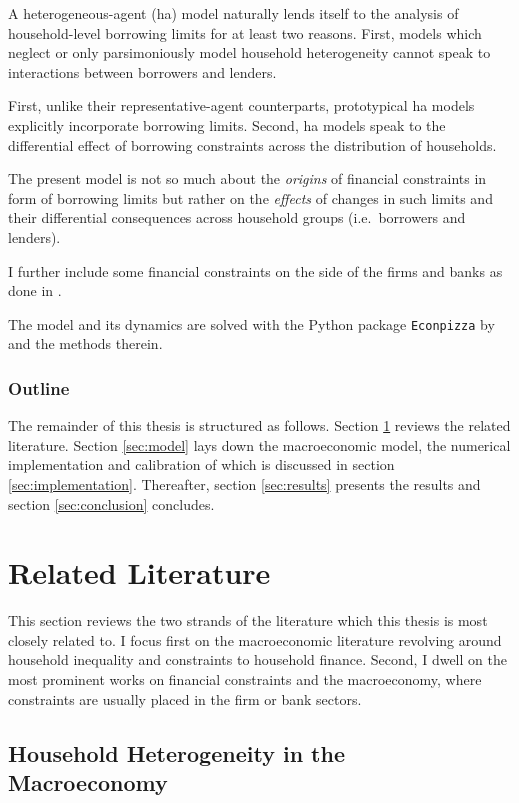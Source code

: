 \documentclass[12pt]{article}
\numberwithin{equation}{section} %
\begin{document}
A heterogeneous-agent (\Gls{ha}) model naturally lends itself to the analysis of household-level borrowing limits for at least two reasons. First, models which neglect or only parsimoniously model household heterogeneity cannot speak to interactions between borrowers and lenders.

First, unlike their representative-agent counterparts, prototypical \Gls{ha} models explicitly incorporate borrowing limits. Second, \Gls{ha} models speak to the differential effect of borrowing constraints across the distribution of households.

The present model is not so much about the \textit{origins} of financial constraints in form of borrowing limits but rather on the \textit{effects} of changes in such limits and their differential consequences across household groups (i.e.~borrowers and lenders).

I further include some financial constraints on the side of the firms and banks as done in \textcite{zoch2022}.

The model and its dynamics are solved with the Python package \texttt{Econpizza} by \textcite{boehl2023econpizza} and the methods therein.

\subsubsection*{Outline}
\label{sec:outline}
The remainder of this thesis is structured as follows. Section \ref{sec:literature} reviews the related literature. Section \ref{sec:model} lays down the macroeconomic model, the numerical implementation and calibration of which is discussed in section \ref{sec:implementation}. Thereafter, section \ref{sec:results} presents the results and section \ref{sec:conclusion} concludes.

\section{Related Literature}
\label{sec:literature}

This section reviews the two strands of the literature which this thesis is most closely related to. I focus first on the macroeconomic literature revolving around household inequality and constraints to household finance. Second, I dwell on the most prominent works on financial constraints and the macroeconomy, where constraints are usually placed in the firm or bank sectors.

\subsection{Household Heterogeneity in the Macroeconomy}
\label{sec:literature-hetero}
\end{document}
